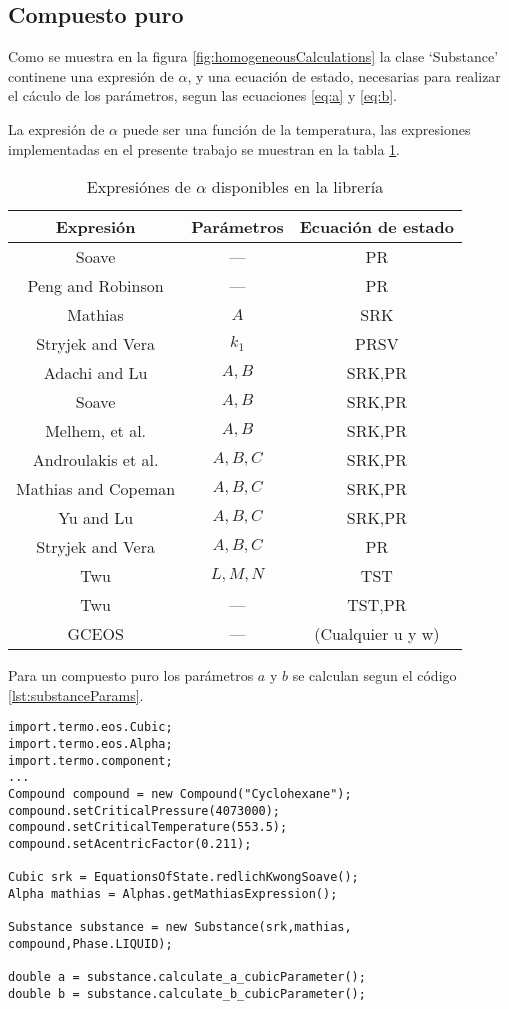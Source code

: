 \subsection{Compuesto puro}\label{subsec:substance}

Como se muestra en la figura \ref{fig:homogeneousCalculations} la clase `Substance' continene una expresión de $\alpha$, y una ecuación de estado, necesarias para realizar el cáculo de los parámetros, segun las ecuaciones \ref{eq:a} y \ref{eq:b}. 

La expresión de $\alpha$ puede ser una función de la temperatura, las expresiones implementadas en el presente trabajo se muestran en la tabla \ref{tab:alphas}.

\begin{table}[!h]
	\centering
	\caption{Expresiónes de $\alpha$ disponibles en la librería}\label{tab:alphas}
	\begin{tabular}{|c|c|c| }
		\hline
		Expresión & Parámetros & Ecuación de estado\\
		\hline
		Soave    &  ---& PR\\
		Peng and Robinson & ---& PR \\
		Mathias & $A$ & SRK\\
		Stryjek and Vera & $k_1$ & PRSV\\
		Adachi and Lu & $A,B$&SRK,PR\\
		Soave & $A,B$&SRK,PR\\
		Melhem, et al. & $A,B$&SRK,PR\\
		Androulakis et al. & $A,B,C$& SRK,PR\\
		Mathias and Copeman & $A,B,C$& SRK,PR\\
		Yu and Lu & $A,B,C$&SRK,PR\\
		Stryjek and Vera & $A,B,C$&PR\\
		Twu & $L,M,N$&TST\\
		Twu & ---&TST,PR\\
		GCEOS & ---& (Cualquier u y w)\\
		\hline
	\end{tabular}
\end{table}


Para un compuesto puro los parámetros $a$ y $b$ se calculan segun el código \ref{lst:substanceParams}.


\begin{lstlisting}[caption={Cálculo de los parámetros para el Ciclohexano, con la ecuación de estado Soave Redlich Kwong y la expresión de $\alpha$ de mathias },label={lst:substanceParams}]
import.termo.eos.Cubic;
import.termo.eos.Alpha;
import.termo.component;
...
Compound compound = new Compound("Cyclohexane");
compound.setCriticalPressure(4073000);
compound.setCriticalTemperature(553.5);
compound.setAcentricFactor(0.211);

Cubic srk = EquationsOfState.redlichKwongSoave();
Alpha mathias = Alphas.getMathiasExpression();

Substance substance = new Substance(srk,mathias, compound,Phase.LIQUID);

double a = substance.calculate_a_cubicParameter();
double b = substance.calculate_b_cubicParameter();
\end{lstlisting}

